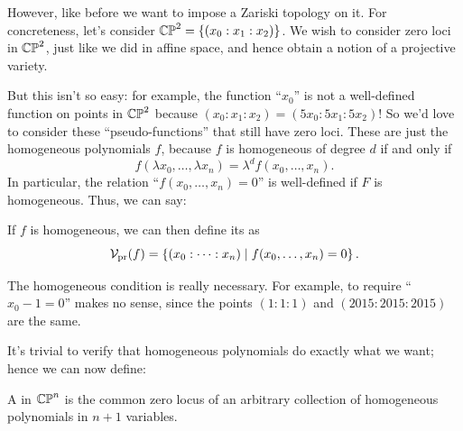 However, like before we want to impose a Zariski topology on it.
For concreteness, let's consider $\mathbb{CP}^2 = \left\{ (x_0 : x_1 : x_2) \right\}$.
We wish to consider zero loci in $\mathbb{CP}^2$, just like we did in affine space,
and hence obtain a notion of a projective variety.

But this isn't so easy: for example,
the function ``$x_0$'' is not a well-defined function on points in $\mathbb{CP}^2$ 
because $(x_0 : x_1 : x_2) = (5x_0 : 5x_1 : 5x_2)$!
So we'd love to consider these ``pseudo-functions''
that still have zero loci. These are just the homogeneous polynomials $f$,
because $f$ is homogeneous of degree $d$ if and only if
\[
	f(\lambda x_0, \dots, \lambda x_n)
	= \lambda^d f(x_0, \dots, x_n).
\]
In particular, the relation ``$f(x_0, \dots, x_n) = 0$'' is
well-defined if $F$ is homogeneous. Thus, we can say:
\begin{definition}
	If $f$ is homogeneous, we can then define its  as
	\[
		\mathcal V_{\text{pr}}(f)
		= \left\{ (x_0 : \dots : x_n) \mid f(x_0, \dots, x_n) = 0 \right\}.
	\]
\end{definition}

The homogeneous condition is really necessary.
For example, to require ``$x_0 - 1 = 0$'' makes no sense,
since the points $(1:1:1)$ and $(2015:2015:2015)$ are the same.

It's trivial to verify that homogeneous polynomials do exactly what we want;
hence we can now define:
\begin{definition}
	A  in $\mathbb{CP}^n$
	is the common zero locus of an arbitrary
	collection of homogeneous polynomials in $n+1$ variables.
\end{definition}

